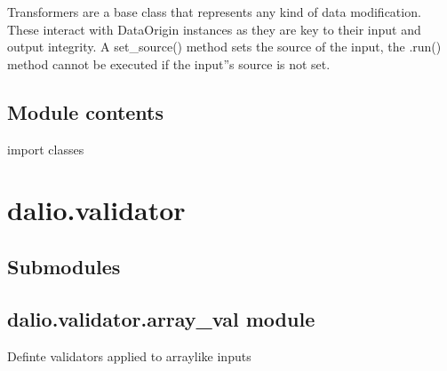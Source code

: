 \documentclass[letterpaper,10pt,english]{sphinxmanual}
\begin{document}
Transformers are a base class that represents any kind of data modification.
These interact with DataOrigin instances as they are key to their input and
output integrity. A set\_source() method sets the source of the input, the
.run() method cannot be executed if the input”s source is not set.


\section{Module contents}
\label{\detokenize{dalio.base:module-dalio.base}}\label{\detokenize{dalio.base:module-contents}}
import classes


\chapter{dalio.validator}
\label{\detokenize{dalio.validator:dalio-validator}}\label{\detokenize{dalio.validator::doc}}

\section{Submodules}
\label{\detokenize{dalio.validator:submodules}}

\section{dalio.validator.array\_val module}
\label{\detokenize{dalio.validator:module-dalio.validator.array_val}}\label{\detokenize{dalio.validator:dalio-validator-array-val-module}}
Definte validators applied to array\sphinxhyphen{}like inputs
\end{document}
